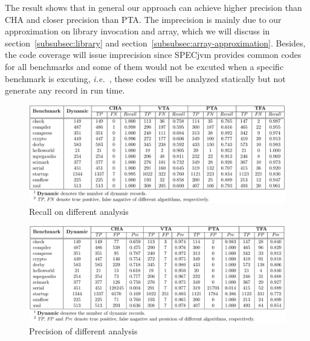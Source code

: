 \documentclass{fac}
\newcommand\ie{\textit{i.e.\ }}
\begin{document}
The result shows that in general our approach can achieve higher precision than CHA and closer precision than PTA. The imprecision is mainly due to our approximation on library invocation and array, which we will discuss in section~\ref{subsubsec:library} and section~\ref{subsubsec:array-approximation}. Besides, the code coverage will issue imprecision since SPECjvm provides common codes for all benchmarks and some of them would not be excuted when a specific benchmark is excuting, \ie, these codes will be analyzed statically but not generate any record in run time.

\begin{figure}\centering
\includegraphics[scale=0.9]{recall.pdf}
\caption{Recall on different analysis}
\label{fig:recall}
\end{figure}

\begin{figure}\centering
\includegraphics[scale=0.9]{precision.pdf}
\caption{Precision of different analysis}
\label{fig:precision}
\end{figure}
\end{document}
